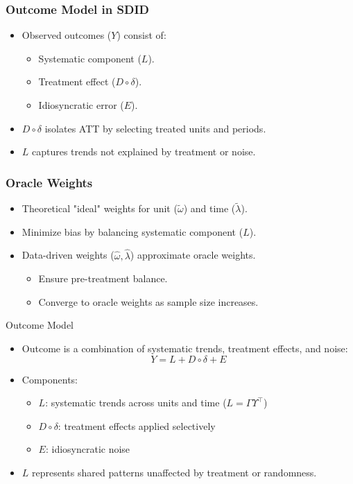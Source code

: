 \documentclass{beamer}
\begin{document}
\begin{frame}
\frametitle{Outcome Model in SDID}

\begin{itemize}
    \item Observed outcomes (\(Y\)) consist of:
        \begin{itemize}
            \item Systematic component (\(L\)).
            \item Treatment effect (\(D \circ \delta\)).
            \item Idiosyncratic error (\(E\)).
        \end{itemize}
    \item \(D \circ \delta\) isolates ATT by selecting treated units and periods.
    \item \(L\) captures trends not explained by treatment or noise.
\end{itemize}

\end{frame}




\begin{frame}
\frametitle{Oracle Weights}

\begin{itemize}
    \item Theoretical "ideal" weights for unit (\(\tilde{\omega}\)) and time (\(\tilde{\lambda}\)).
    \item Minimize bias by balancing systematic component (\(L\)).
    \item Data-driven weights (\(\hat{\omega}, \hat{\lambda}\)) approximate oracle weights.
        \begin{itemize}
            \item Ensure pre-treatment balance.
            \item Converge to oracle weights as sample size increases.
        \end{itemize}
\end{itemize}

\end{frame}



\begin{frame}{Outcome Model}
\begin{itemize}
\item Outcome is a combination of systematic trends, treatment effects, and noise:
\[
Y = L + D \circ \delta + E
\]
\item Components:
    \begin{itemize}
    \item \(L\): systematic trends across units and time (\(L = \Gamma \Upsilon^\top\))
    \item \(D \circ \delta\): treatment effects applied selectively
    \item \(E\): idiosyncratic noise
    \end{itemize}
\item \(L\) represents shared patterns unaffected by treatment or randomness.
\end{itemize}
\end{frame}
\end{document}
